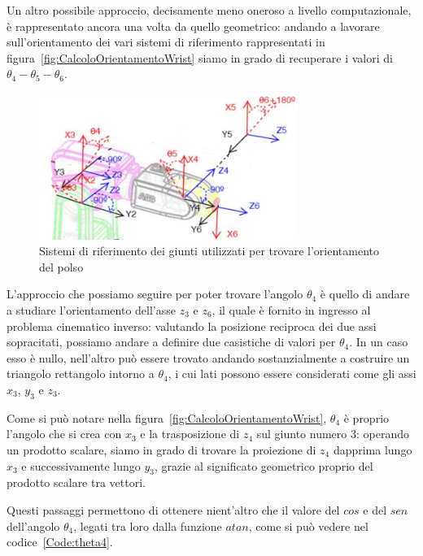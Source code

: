 Un altro possibile approccio, decisamente meno oneroso a livello computazionale, è rappresentato ancora una volta da quello geometrico: andando a lavorare sull'orientamento dei vari sistemi di riferimento rappresentati in figura~\vref{fig:CalcoloOrientamentoWrist} siamo in grado di recuperare i valori di $\theta_4 - \theta_5 -\theta_6$. 
\begin{figure}
	\centering
	\includegraphics[width=0.75\textwidth]{Immagini/SistemiDiRiferimento_OrientamentoWrist}
	\caption{Sistemi di riferimento dei giunti utilizzati per trovare l'orientamento del polso} 
	\label{fig:CalcoloOrientamentoWrist}
\end{figure}

L'approccio che possiamo seguire per poter trovare l'angolo $\theta_4$ è quello di andare a studiare l'orientamento dell'asse $z_3$ e $z_6$, il quale è fornito in ingresso al problema cinematico inverso: valutando la posizione reciproca dei due assi sopracitati, possiamo andare a definire due casistiche di valori per $\theta_4$. In un caso esso è nullo, nell'altro può essere trovato andando sostanzialmente a costruire un triangolo rettangolo intorno a $\theta_4$, i cui lati possono essere considerati come gli assi $x_3$, $y_3$ e $z_3$.

Come si può notare nella figura~\vref{fig:CalcoloOrientamentoWrist}, $\theta_4$ è proprio l'angolo che si crea con $x_3$ e la trasposizione di $z_4$ sul giunto numero 3: operando un prodotto scalare, siamo in grado di trovare la proiezione di $z_4$ dapprima lungo $x_3$ e successivamente lungo $y_3$, grazie al significato geometrico proprio del prodotto scalare tra vettori.

Questi passaggi permettono di ottenere nient'altro che il valore del $cos$ e del $sen$ dell'angolo $\theta_4$, legati tra loro dalla funzione $atan$, come si può vedere nel codice~\vref{Code:theta4}.

